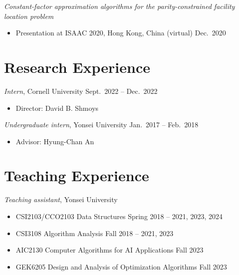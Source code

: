 \documentclass{article}
\newcommand{\killinitspace}{-0.7em}
\begin{document}
\textsl{Constant-factor approximation algorithms for the parity-constrained facility location problem}
\vspace{\killinitspace}
\begin{itemize}
\item Presentation at ISAAC 2020, Hong Kong, China (virtual) \hfill Dec.~2020
\end{itemize}



\section{Research Experience}
\textsl{Intern}, Cornell University \hfill Sept.~2022 -- Dec.~2022
\vspace{\killinitspace}
\begin{itemize}
\item Director: David B. Shmoys
\end{itemize}

\textsl{Undergraduate intern}, Yonsei University \hfill Jan.~2017 -- Feb.~2018
\vspace{\killinitspace}
\begin{itemize}
\item Advisor: Hyung-Chan An
\end{itemize}

\section{Teaching Experience}
\textsl{Teaching assistant}, Yonsei University
\vspace{\killinitspace}
\begin{itemize}
\item CSI2103/CCO2103 Data Structures \hfill Spring 2018 -- 2021, 2023, 2024
\item CSI3108 Algorithm Analysis \hfill Fall 2018 -- 2021, 2023
\item AIC2130 Computer Algorithms for AI Applications \hfill Fall 2023
\item GEK6205 Design and Analysis of Optimization Algorithms \hfill Fall 2023
\end{itemize}
\end{document}
